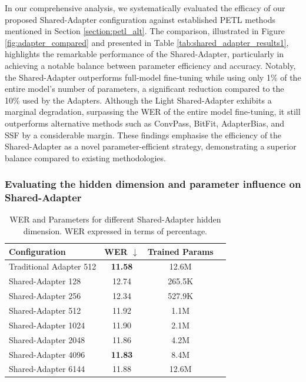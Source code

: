 In our comprehensive analysis, we systematically evaluated the efficacy of our proposed Shared-Adapter configuration against established \ac{PETL} methods mentioned in Section \ref{section:petl_alt}. The comparison, illustrated in Figure \ref{fig:adapter_compared} and presented in Table \ref{tab:shared_adapter_results1}, highlights the remarkable performance of the Shared-Adapter, particularly in achieving a notable balance between parameter efficiency and accuracy. Notably, the Shared-Adapter outperforms full-model fine-tuning while using only 1\% of the entire model's number of parameters, a significant reduction compared to the 10\% used by the Adapters. Although the Light Shared-Adapter exhibits a marginal degradation, surpassing the \ac{WER} of the entire model fine-tuning, it still outperforms alternative methods such as ConvPass, BitFit, AdapterBias, and \ac{SSF} by a considerable margin. These findings emphasise the efficiency of the Shared-Adapter as a novel parameter-efficient strategy, demonstrating a superior balance compared to existing methodologies. 

\subsubsection{Evaluating the hidden dimension and parameter influence on Shared-Adapter}
\begin{table}[h]
    \centering
    \begin{tabular}{l c c c}
        \hline
        \textbf{Configuration} & \textbf{WER $\downarrow$} & \textbf{Trained Params} \\
        \hline
        Traditional Adapter 512 & \textbf{11.58} & 12.6M \\ \hline
        Shared-Adapter 128 & 12.74 & 265.5K \\
        Shared-Adapter 256 & 12.34 & 527.9K \\
        Shared-Adapter 512 & 11.92 & 1.1M \\
        Shared-Adapter 1024 & 11.90 & 2.1M \\
        Shared-Adapter 2048 & 11.86 & 4.2M \\
        Shared-Adapter 4096 & \textbf{11.83} & 8.4M \\
        Shared-Adapter 6144 & 11.88 & 12.6M \\ \hline
    \end{tabular}
    \caption{WER and Parameters for different Shared-Adapter hidden dimension. WER expressed in terms of percentage.}
    \label{tab:shared_adapter_results}
\end{table}


